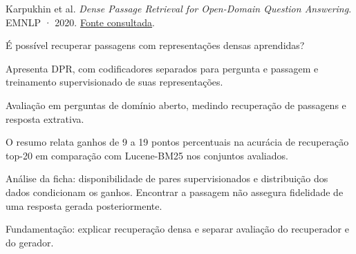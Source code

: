{\small Karpukhin et al. \textit{Dense Passage Retrieval for Open-Domain Question Answering}. EMNLP · 2020. \href{https://aclanthology.org/2020.emnlp-main.550.pdf}{Fonte consultada}.\par}

É possível recuperar passagens com representações densas aprendidas?

Apresenta DPR, com codificadores separados para pergunta e passagem e treinamento supervisionado de suas representações.

Avaliação em perguntas de domínio aberto, medindo recuperação de passagens e resposta extrativa.

O resumo relata ganhos de 9 a 19 pontos percentuais na acurácia de recuperação top-20 em comparação com Lucene-BM25 nos conjuntos avaliados.

\begin{itemize}
\end{itemize}

Análise da ficha: disponibilidade de pares supervisionados e distribuição dos dados condicionam os ganhos. Encontrar a passagem não assegura fidelidade de uma resposta gerada posteriormente.

Fundamentação: explicar recuperação densa e separar avaliação do recuperador e do gerador.

